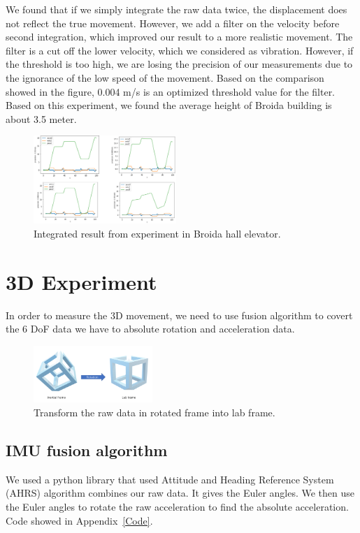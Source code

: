 \documentclass[%
 reprint,
 amsmath,amssymb,
 aps,
]{revtex4-2}
\begin{document}
We found that if we simply integrate the raw data twice, the displacement does not reflect the true movement. However, we add a filter on the velocity before second integration, which improved our result to a more realistic movement. The filter is a cut off the lower velocity, which we considered as vibration. However, if the threshold is too high, we are losing the precision of our measurements due to the ignorance of the low speed of the movement. Based on the comparison showed in the figure, 0.004 m/s is an optimized threshold value for the filter. Based on this experiment, we found the average height of Broida building is about 3.5 meter. 
\begin{figure}[H]
\includegraphics[width=0.48\textwidth]{broida.png}
\caption{\label{broida}Integrated result from experiment in Broida hall elevator.}
\end{figure}

\section{\label{3Dexperiment}3D Experiment}
In order to measure the 3D movement, we need to use fusion algorithm to covert the 6 DoF data we have to absolute rotation and acceleration data.
\begin{figure}[H]
\includegraphics[width=0.4\textwidth]{rotation2.png}
\caption{\label{rotation2}Transform the raw data in rotated frame into lab frame.}
\end{figure}

\subsection{IMU fusion algorithm}
We used a python library that used Attitude and Heading Reference System (AHRS)\cite{ahrs,ahrsthesis} algorithm combines our raw data. It gives the Euler angles. We then use the Euler angles to rotate the raw acceleration to find the absolute acceleration. Code showed in Appendix~\ref{Code}.
\end{document}
